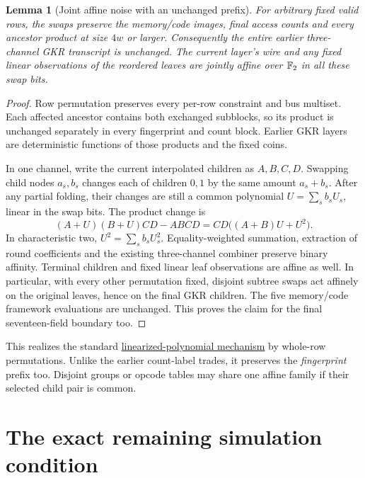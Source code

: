 \documentclass[11pt]{article}
\newtheorem{lemma}{Lemma}
\begin{document}
\begin{lemma}[Joint affine noise with an unchanged prefix]
For arbitrary fixed valid rows, the swaps preserve the memory/code images, final access counts and every ancestor product at size $4w$ or larger. Consequently the entire earlier three-channel GKR transcript is unchanged. The current layer's wire and any fixed linear observations of the reordered leaves are jointly affine over $\mathbb{F}_2$ in all these swap bits.
\end{lemma}
\begin{proof}
Row permutation preserves every per-row constraint and bus multiset. Each affected ancestor contains both exchanged subblocks, so its product is unchanged separately in every fingerprint and count block. Earlier GKR layers are deterministic functions of those products and the fixed coins.

In one channel, write the current interpolated children as $A,B,C,D$. Swapping child nodes $a_s,b_s$ changes each of children $0,1$ by the same amount $a_s+b_s$. After any partial folding, their changes are still a common polynomial $U=\sum_s b_s U_s$, linear in the swap bits. The product change is
\[
 (A+U)(B+U)CD-ABCD=CD\bigl((A+B)U+U^2\bigr).
\]
In characteristic two, $U^2=\sum_s b_sU_s^2$. Equality-weighted summation, extraction of round coefficients and the existing three-channel combiner preserve binary affinity. Terminal children and fixed linear leaf observations are affine as well. In particular, with every other permutation fixed, disjoint subtree swaps act affinely on the original leaves, hence on the final GKR children. The five memory/code framework evaluations are unchanged. This proves the claim for the final seventeen-field boundary too.
\end{proof}

This realizes the standard \href{https://arxiv.org/abs/1211.5475}{linearized-polynomial mechanism} by whole-row permutations. Unlike the earlier count-label trades, it preserves the \emph{fingerprint} prefix too. Disjoint groups or opcode tables may share one affine family if their selected child pair is common.

\section{The exact remaining simulation condition}
\end{document}
